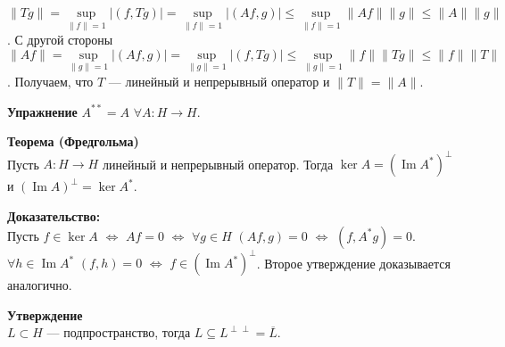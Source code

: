 \documentclass[12pt]{article}
\DeclareMathOperator{\Imm}{Im}
\begin{document}
$\|Tg\| = \sup\limits_{\|f\| = 1}|(f, Tg)| = \sup\limits_{\|f\| = 1}|(Af, g)| \le \sup\limits_{\|f\| = 1}\|Af\|\|g\| \le \|A\|\|g\|$.
С другой стороны $\|Af\| = \sup\limits_{\|g\| = 1}|(Af, g)| = \sup\limits_{\|g\| = 1}|(f, Tg)| \le \sup\limits_{\|g\| = 1} \|f\| \|Tg\| \le \|f\| \|T\|$.
Получаем, что $T$ --- линейный и непрерывный оператор и $\|T\| = \|A\|$.

\textbf{Упражнение} $A^{**} = A$ $\forall A : H \to H$.

\textbf{Теорема (Фредгольма)}\\
Пусть $A : H \to H$ линейный и непрерывный оператор. Тогда $\ker A = (\Imm A^*)^\perp$ и $(\Imm A)^\perp = \ker A^*$.

\textbf{Доказательство:}\\
Пусть $f \in \ker A$ $\Leftrightarrow$ $Af = 0$ $\Leftrightarrow$ $\forall g \in H$ $(Af, g) = 0$ $\Leftrightarrow$ $(f, A^* g) = 0$.
$\forall h \in \Imm A^*$ $(f, h) = 0$ $\Leftrightarrow$ $f \in (\Imm A^*)^\perp$. Второе утверждение доказывается аналогично.

\textbf{Утверждение}\\
$L \subset H$ --- подпространство, тогда $L \subseteq L^{\perp\perp} = \overline{L}$.

\end{document}
